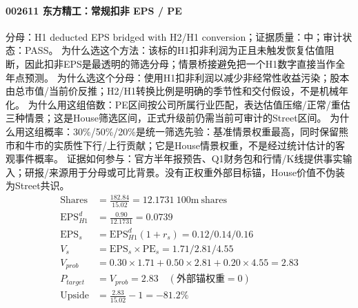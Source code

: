\paragraph{002611 东方精工：常规扣非 EPS / PE}
分母：H1 deducted EPS bridged with H2/H1 conversion；证据质量：中；审计状态：PASS。
为什么选这个方法：该标的H1扣非利润为正且未触发恢复估值阻断，因此扣非EPS是最透明的筛选分母；情景桥接避免把一个H1数字直接当作全年点预测。
为什么选这个分母：使用H1扣非利润以减少非经常性收益污染；股本由总市值/当前价反推；H2/H1转换比例是明确的季节性和交付假设，不是机械年化。
为什么用这组倍数：PE区间按公司所属行业匹配，表达估值压缩/正常/重估三种情景；这是House筛选区间，正式升级前仍需当前可审计的Street区间。
为什么用这组概率：30\%/50\%/20\%是统一筛选先验：基准情景权重最高，同时保留熊市和牛市的实质性下行/上行贡献；它是House情景权重，不是经过统计估计的客观事件概率。
证据如何参与：官方半年报预告、Q1财务包和行情/K线提供事实输入；研报/来源用于分母或可比背景。没有正权重外部目标锚，House价值不伪装为Street共识。
\begin{align*}
\mathrm{Shares} &= \frac{182.84}{15.02}=12.1731\ \mathrm{100m\ shares}\\
\mathrm{EPS}_{H1}^d &= \frac{0.90}{12.1731}=0.0739\\
\mathrm{EPS}_s &= \mathrm{EPS}_{H1}^d(1+r_s)=0.12/0.14/0.16\\
V_s &= \mathrm{EPS}_s\times \mathrm{PE}_s=1.71/2.81/4.55\\
V_{prob} &= 0.30\times 1.71+0.50\times 2.81+0.20\times 4.55=2.83\\
P_{target} &= V_{prob}=2.83\quad(\text{外部锚权重}=0)\\
\mathrm{Upside} &= \frac{2.83}{15.02}-1=-81.2\%\\
\end{align*}

